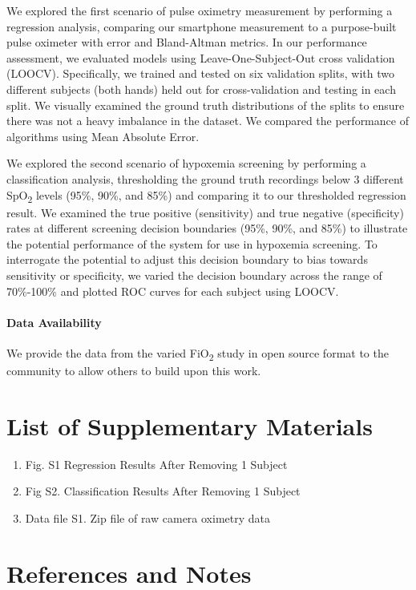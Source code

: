 \documentclass[12pt]{article}
\begin{document}
We explored the first scenario of pulse oximetry measurement by performing a regression analysis, comparing our smartphone measurement to a purpose-built pulse oximeter with error and Bland-Altman metrics. In our performance assessment, we evaluated models using Leave-One-Subject-Out cross validation (LOOCV). Specifically, we trained and tested on six validation splits, with two different subjects (both hands) held out for cross-validation and testing in each split. We visually examined the ground truth distributions of the splits to ensure there was not a heavy imbalance in the dataset. We compared the performance of algorithms using Mean Absolute Error.

We explored the second scenario of hypoxemia screening by performing a classification analysis, thresholding the ground truth recordings below 3 different SpO\textsubscript{2} levels (95\%, 90\%, and 85\%) and comparing it to our thresholded regression result. We examined the true positive (sensitivity) and true negative (specificity) rates at different screening decision boundaries (95\%, 90\%, and 85\%) to illustrate the potential performance of the system for use in hypoxemia screening. To interrogate the potential to adjust this decision boundary to bias towards sensitivity or specificity, we varied the decision boundary across the range of 70\%-100\% and plotted ROC curves for each subject using LOOCV.

\paragraph*{Data Availability}
We provide the data from the varied FiO\textsubscript{2} study in open source format to the community to allow others to build upon this work.

\section*{List of Supplementary Materials}
\begin{enumerate}
    \item Fig. S1 Regression Results After Removing 1 Subject
    \item Fig S2. Classification Results After Removing 1 Subject
    \item Data file S1. Zip file of raw camera oximetry data
\end{enumerate}

\section*{References and Notes}

\end{document}
